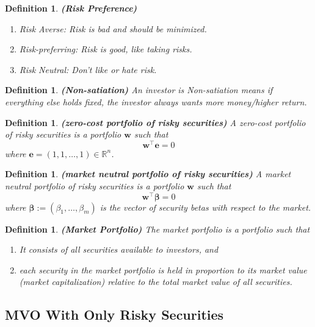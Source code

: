 \documentclass[13pt]{article}
\newtheorem{definition}[theorem]{Definition}
\theoremstyle{definition}
\theoremstyle{remark}
\begin{document}
\begin{definition} \label{def: Risk Preference}
    \textbf{(Risk Preference)}
    \begin{enumerate}
        \item Risk Averse: Risk is bad and should be minimized.
        \item Risk-preferring: Risk is good, like taking risks.
        \item Risk Neutral: Don't like or hate risk.
    \end{enumerate}
\end{definition}

\begin{definition} \label{def: Non-satiation}
    \textbf{(Non-satiation)}
    An investor is Non-satiation means if everything else holds fixed, the investor always wants more money/higher return.
\end{definition}

\begin{definition}\textbf{(zero-cost portfolio of risky securities)}
    A zero-cost portfolio of risky securities is a portfolio $\bm{w}$ such that
$$
\bm{w}^{\top} \bm{e}=0
$$
where $\bm{e}=(1,1,\ldots, 1)\in \mathbb{R}^n$.
\end{definition}

\begin{definition}\textbf{(market neutral portfolio of risky securities)}
    A market neutral portfolio of risky securities is a portfolio $\bm{w}$ such that
$$
\bm{w}^{\top} \bm{\bm{\beta}}=0
$$
where $ \bm{\bm{\beta}}:=\left(\beta_{1}, \ldots, \beta_{m}\right)$ is the vector of security betas with respect to the market.
\end{definition}

\begin{definition}\label{def:Market Portfolio}\textbf{(Market Portfolio)} The market portfolio is a portfolio such that 
    \begin{enumerate}[label=(\alph*)]
  \item It consists of all securities available to investors, and
  \item each security in the market portfolio is held in proportion to its market value (market capitalization) relative to the total market value of all securities.
  \end{enumerate}
\end{definition}

\subsection{MVO With Only Risky Securities}
\end{document}
